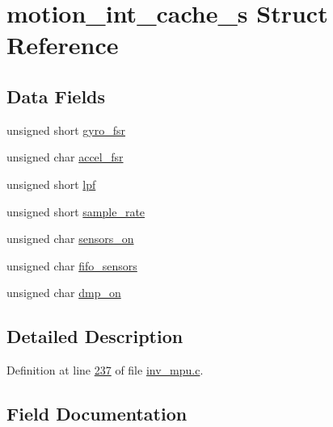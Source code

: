 \hypertarget{structmotion__int__cache__s}{}\section{motion\+\_\+int\+\_\+cache\+\_\+s Struct Reference}
\label{structmotion__int__cache__s}
\subsection*{Data Fields}
\begin{DoxyCompactItemize}
\item 
unsigned short \hyperlink{structmotion__int__cache__s_a6424d033f39042e9e1105c14f6fa89d7}{gyro\+\_\+fsr}
\item 
unsigned char \hyperlink{structmotion__int__cache__s_a97d5de8aa2fab5cc81ca2180130fc6ac}{accel\+\_\+fsr}
\item 
unsigned short \hyperlink{structmotion__int__cache__s_a0ba1d4e0bb375eb3050352ddef12d25f}{lpf}
\item 
unsigned short \hyperlink{structmotion__int__cache__s_a1aa4e026c4d2f691506f2d713a405aea}{sample\+\_\+rate}
\item 
unsigned char \hyperlink{structmotion__int__cache__s_a90574f8e8515ef8fee3114ba7e0ddc5c}{sensors\+\_\+on}
\item 
unsigned char \hyperlink{structmotion__int__cache__s_ae3cc01b3471d10bd06f81fbf628f3e19}{fifo\+\_\+sensors}
\item 
unsigned char \hyperlink{structmotion__int__cache__s_a49fb51079238683b21264827348b5968}{dmp\+\_\+on}
\end{DoxyCompactItemize}


\subsection{Detailed Description}


Definition at line \hyperlink{inv__mpu_8c_source_l00237}{237} of file \hyperlink{inv__mpu_8c_source}{inv\+\_\+mpu.\+c}.



\subsection{Field Documentation}
